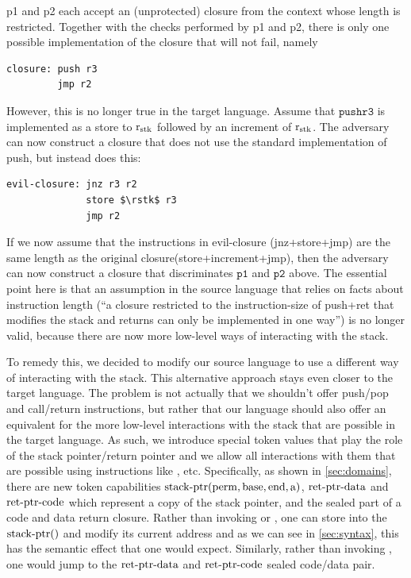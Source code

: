 \documentclass[a4paper]{article}
\begin{document}
p1 and p2 each accept an (unprotected) closure from the context whose length is restricted.
Together with the checks performed by p1 and p2, there is only one possible implementation of the closure that will not fail, namely
\begin{lstlisting}[basicstyle=\sourcecolor{}\ttfamily] 
closure: push r3
         jmp r2
\end{lstlisting}

However, this is no longer true in the target language.
Assume that $\mathtt{push r3}$ is implemented as a store to $\mathrm{r}_\mathrm{stk}$ followed by an increment of $\mathrm{r}_\mathrm{stk}$.
The adversary can now construct a closure that does not use the standard implementation of push, but instead does this:
\begin{lstlisting}[basicstyle=\targetcolor{}\ttfamily] 
evil-closure: jnz r3 r2
              store $\rstk$ r3
              jmp r2
\end{lstlisting}
If we now assume that the instructions in evil-closure (jnz+store+jmp) are the same length as the original closure(store+increment+jmp), then the adversary can now construct a closure that discriminates $\mathtt{p1}$ and $\mathtt{p2}$ above.
The essential point here is that an assumption in the source language that relies on facts about instruction length (``a closure restricted to the instruction-size of push+ret that modifies the stack and returns can only be implemented in one way'') is no longer valid, because there are now more low-level ways of interacting with the stack.

To remedy this, we decided to modify our source language to use a different way of interacting with the stack.
This alternative approach stays even closer to the target language.
The problem is not actually that we shouldn't offer push/pop and call/return instructions, but rather that our language should also offer an equivalent for the more low-level interactions with the stack that are possible in the target language.
As such, we introduce special token values that play the role of the stack pointer/return pointer and we allow all interactions with them that are possible using instructions like \sstore{}{}, \smove{}{} etc.
Specifically, as shown in \cref{sec:domains}, there are new token capabilities $\mathrm{stack\text{-}ptr}(\mathrm{perm},\mathrm{base},\mathrm{end},\mathrm{a})$, $\mathrm{ret\text{-}ptr\text{-}data}$ and $\mathrm{ret\text{-}ptr\text{-}code}$ which represent a copy of the stack pointer, and the sealed part of a code and data return closure.
Rather than invoking \spush{} or \spop{}, one can store into the $\mathrm{stack\text{-}ptr}()$ and modify its current address and as we can see in \cref{sec:syntax}, this has the semantic effect that one would expect.
Similarly, rather than invoking \sreturn{}, one would jump to the $\mathrm{ret\text{-}ptr\text{-}data}$ and $\mathrm{ret\text{-}ptr\text{-}code}$ sealed code/data pair.
\end{document}
